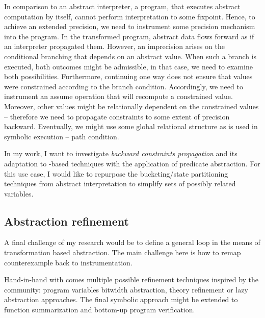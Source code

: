 In comparison to an abstract interpreter, a program, that executes abstract
computation by itself, cannot perform interpretation to some fixpoint. Hence,
to achieve an extended precision, we need to instrument some precision
mechanism into the program. In the transformed program, abstract data flows
forward as if an interpreter propagated them. However, an imprecision arises on
the conditional branching that depends on an abstract value. When such a branch
is executed, both outcomes might be admissible, in that case, we need to
examine both possibilities. 
Furthermore, continuing one way does not ensure that values were constrained
according to the branch condition. Accordingly, we need to instrument an assume
operation that will recompute a constrained value. Moreover, other values might
be relationally dependent on the constrained values -- therefore we need to
propagate constraints to some extent of precision backward. Eventually, we
might use some global relational structure as is used in symbolic execution --
path condition.

In my work, I want to investigate \emph{backward constraints propagation} and
its adaptation to \cegar-based techniques with the application of predicate
abstraction. For this use case, I would like to repurpose the bucketing/state
partitioning techniques from abstract interpretation to simplify sets of
possibly related variables.



\subsection{Abstraction refinement}


A final challenge of my research would be to define a general \cegar loop in the
means of transformation based abstraction. The main challenge here is how to
remap counterexample back to instrumentation.

Hand-in-hand with \cegar comes multiple possible refinement techniques inspired
by the \smt community: program variables bitwidth abstraction, theory refinement
or lazy abstraction approaches. The final symbolic approach might be extended
to function summarization and bottom-up program verification.


